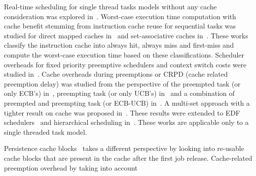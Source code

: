 Real-time scheduling for single thread tasks models without any cache consideration was explored in~\cite{}. Worst-case execution time computation with cache benefit stemming from instruction cache reuse for sequential tasks was studied for direct mapped caches in~\cite{Arnold:1994, Mueller:1995,Mueller:2000} and set-associative caches in~\cite{Li:1996}. These works classify the instruction cache into always hit, always miss and first-miss and compute the worst-case execution time based on these classifications. Scheduler overheads for fixed priority preemptive schedulers and context switch costs were studied in~\cite{burns:1993, katcher:1993}. Cache overheads during preemptions or CRPD (cache related preemption delay) was studied from the perspective of the preempted task (or only ECB's) in~\cite{Tomiyama:2000, tan:2007}, preempting task (or only UCB's) in~\cite{Lee:1998, altmeyer:2011} and a combination of preempted and preempting task (or ECB-UCB) in~\cite{staschulat:2005}. A multi-set approach with a tighter result on cache  was proposed in~\cite{altmeyer:2012}. These results were extended to EDF schedulers~\cite{lunniss:2014a, lunniss:2013} and hierarchical scheduling in~\cite{lunniss:2016, lunniss:2014b}. These works are applicable only to a single threaded task model.

Persistence cache blocks~\cite{Rashid:2016, Rashid:2017} takes a different perspective by looking into re-usable cache blocks that are present in the cache after the first job release. Cache-related preemption overhead by taking into account 




